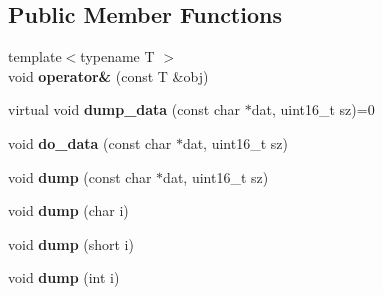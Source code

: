 \subsection*{Public Member Functions}
\begin{DoxyCompactItemize}
\item 
{\footnotesize template$<$typename T $>$ }\\void {\bfseries operator\&} (const T \&obj)\hypertarget{classgxx_1_1archive_1_1binary__serializer__basic_a738d83d711c6b75db269d1dab67c07fb}{}\label{classgxx_1_1archive_1_1binary__serializer__basic_a738d83d711c6b75db269d1dab67c07fb}

\item 
virtual void {\bfseries dump\+\_\+data} (const char $\ast$dat, uint16\+\_\+t sz)=0\hypertarget{classgxx_1_1archive_1_1binary__serializer__basic_a9a6ee8baa50e229dd7635452ce183b18}{}\label{classgxx_1_1archive_1_1binary__serializer__basic_a9a6ee8baa50e229dd7635452ce183b18}

\item 
void {\bfseries do\+\_\+data} (const char $\ast$dat, uint16\+\_\+t sz)\hypertarget{classgxx_1_1archive_1_1binary__serializer__basic_a30337c9dac545308bf37a6df5c56cda2}{}\label{classgxx_1_1archive_1_1binary__serializer__basic_a30337c9dac545308bf37a6df5c56cda2}

\item 
void {\bfseries dump} (const char $\ast$dat, uint16\+\_\+t sz)\hypertarget{classgxx_1_1archive_1_1binary__serializer__basic_aafbd976ea46283071a75b6c748d9c933}{}\label{classgxx_1_1archive_1_1binary__serializer__basic_aafbd976ea46283071a75b6c748d9c933}

\item 
void {\bfseries dump} (char i)\hypertarget{classgxx_1_1archive_1_1binary__serializer__basic_aac1b672e27662d6e950918919445e427}{}\label{classgxx_1_1archive_1_1binary__serializer__basic_aac1b672e27662d6e950918919445e427}

\item 
void {\bfseries dump} (short i)\hypertarget{classgxx_1_1archive_1_1binary__serializer__basic_ae19a3849d71be30f66920fb1e53c702e}{}\label{classgxx_1_1archive_1_1binary__serializer__basic_ae19a3849d71be30f66920fb1e53c702e}

\item 
void {\bfseries dump} (int i)\hypertarget{classgxx_1_1archive_1_1binary__serializer__basic_a5d3bc99853697cd949a3d0a0d9057553}{}\label{classgxx_1_1archive_1_1binary__serializer__basic_a5d3bc99853697cd949a3d0a0d9057553}


\end{DoxyCompactItemize}
